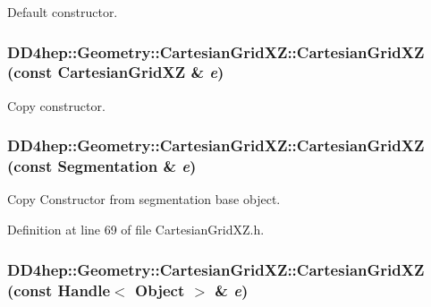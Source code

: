 Default constructor. \hypertarget{class_d_d4hep_1_1_geometry_1_1_cartesian_grid_x_z_aff50e3bc7fdfd7ffc6a931a45f855f7d}{
\subsubsection[{CartesianGridXZ}]{\setlength{\rightskip}{0pt plus 5cm}DD4hep::Geometry::CartesianGridXZ::CartesianGridXZ (const {\bf CartesianGridXZ} \& {\em e})}}
\label{class_d_d4hep_1_1_geometry_1_1_cartesian_grid_x_z_aff50e3bc7fdfd7ffc6a931a45f855f7d}


Copy constructor. \hypertarget{class_d_d4hep_1_1_geometry_1_1_cartesian_grid_x_z_a9db23330d388e78285ae0c5597fc5617}{
\subsubsection[{CartesianGridXZ}]{\setlength{\rightskip}{0pt plus 5cm}DD4hep::Geometry::CartesianGridXZ::CartesianGridXZ (const {\bf Segmentation} \& {\em e})}}
\label{class_d_d4hep_1_1_geometry_1_1_cartesian_grid_x_z_a9db23330d388e78285ae0c5597fc5617}


Copy Constructor from segmentation base object. 

Definition at line 69 of file CartesianGridXZ.h.\hypertarget{class_d_d4hep_1_1_geometry_1_1_cartesian_grid_x_z_a2ac7c5874abd765734541bd8adde8ca0}{
\subsubsection[{CartesianGridXZ}]{\setlength{\rightskip}{0pt plus 5cm}DD4hep::Geometry::CartesianGridXZ::CartesianGridXZ (const {\bf Handle}$<$ {\bf Object} $>$ \& {\em e})}}
\label{class_d_d4hep_1_1_geometry_1_1_cartesian_grid_x_z_a2ac7c5874abd765734541bd8adde8ca0}



